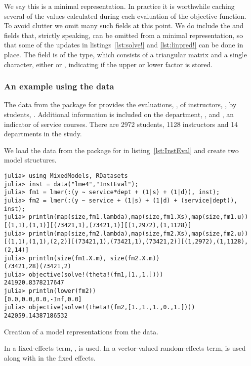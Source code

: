 \documentclass{jss}
\begin{document}
We say this is a minimal representation.  In practice it is worthwhile
caching several of the values calculated during each evaluation of the
objective function.  To avoid clutter we omit many such fields at this
point.  We do include the  and  fields that,
strictly speaking, can be omitted from a minimal representation, so
that some of the updates in listings~\ref{lst:solve!} and
\ref{lst:linpred!} can be done in place.  The  field is of
the  type, which consists of a triangular matrix and a
single character, either  or , indicating if the
upper or lower factor is stored.

\subsubsection{An example using the  data}
\label{sec:InstEval}

The  data from the  package for 
provides the evaluations, , of instructors, , by students,
.  Additional information is included on the department,
, and , an indicator of service courses.
There are 2972 students, 1128 instructors and 14 departments in the study.

We load the data from the  package for
 in listing~\ref{lst:InstEval} and create two model
structures.
\begin{listing}[tbp]
  \begin{verbatim}
julia> using MixedModels, RDatasets
julia> inst = data("lme4","InstEval");
julia> fm1 = lmer(:(y ~ service*dept + (1|s) + (1|d)), inst);
julia> fm2 = lmer(:(y ~ service + (1|s) + (1|d) + (service|dept)), inst);
julia> println(map(size,fm1.lambda),map(size,fm1.Xs),map(size,fm1.u))
[(1,1),(1,1)][(73421,1),(73421,1)][(1,2972),(1,1128)]
julia> println(map(size,fm2.lambda),map(size,fm2.Xs),map(size,fm2.u))
[(1,1),(1,1),(2,2)][(73421,1),(73421,1),(73421,2)][(1,2972),(1,1128),(2,14)]
julia> println(size(fm1.X.m), size(fm2.X.m))
(73421,28)(73421,2)
julia> objective(solve!(theta!(fm1,[1.,1.])))
241920.8378217647
julia> println(lower(fm2))
[0.0,0.0,0.0,-Inf,0.0]
julia> objective(solve!(theta!(fm2,[1.,1.,1.,0.,1.])))
242059.14387186532
  \end{verbatim}
  \caption{Creation of a model representations from the  data.}
  \label{lst:InstEval}
\end{listing}
In  a fixed-effects term, , is used.  In
 a vector-valued random-effects term, 
is used along with  in the fixed effects.
\end{document}
